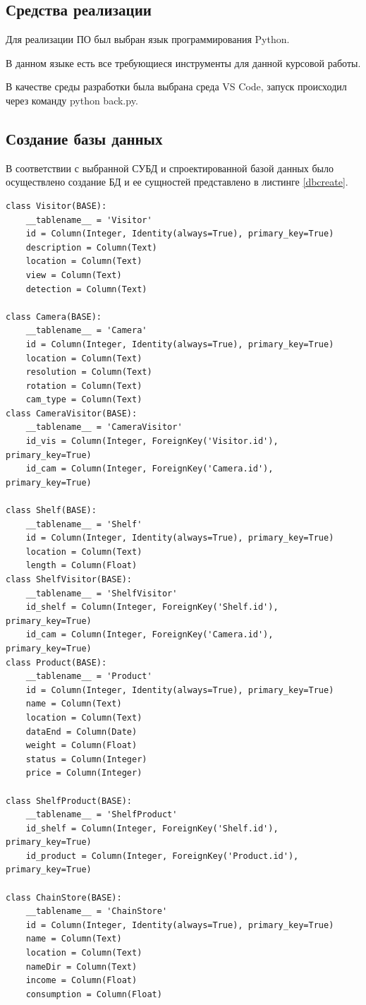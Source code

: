 \subsection{Средства реализации}

Для реализации ПО был выбран язык программирования Python\cite{python}.

В данном языке есть все требующиеся инструменты для данной курсовой работы.

В качестве среды разработки была выбрана среда VS Code\cite{vscode}, запуск
происходил через команду python back.py.

\subsection{Создание базы данных}

В соответствии с выбранной СУБД и спроектированной базой данных было
осуществлено создание БД и ее сущностей представлено в листинге \ref{dbcreate}.

\begin{lstlisting}[label=dbcreate, caption=Создание БД]
class Visitor(BASE):
    __tablename__ = 'Visitor'
    id = Column(Integer, Identity(always=True), primary_key=True)
    description = Column(Text)
    location = Column(Text)
    view = Column(Text)
    detection = Column(Text)

class Camera(BASE):
    __tablename__ = 'Camera'
    id = Column(Integer, Identity(always=True), primary_key=True)
    location = Column(Text)
    resolution = Column(Text)
    rotation = Column(Text)
    cam_type = Column(Text)
class CameraVisitor(BASE):
    __tablename__ = 'CameraVisitor'
    id_vis = Column(Integer, ForeignKey('Visitor.id'), primary_key=True)
    id_cam = Column(Integer, ForeignKey('Camera.id'), primary_key=True)

class Shelf(BASE):
    __tablename__ = 'Shelf'
    id = Column(Integer, Identity(always=True), primary_key=True)
    location = Column(Text)
    length = Column(Float)
class ShelfVisitor(BASE):
    __tablename__ = 'ShelfVisitor'
    id_shelf = Column(Integer, ForeignKey('Shelf.id'), primary_key=True)
    id_cam = Column(Integer, ForeignKey('Camera.id'), primary_key=True)
class Product(BASE):
    __tablename__ = 'Product'
    id = Column(Integer, Identity(always=True), primary_key=True)
    name = Column(Text)
    location = Column(Text)
    dataEnd = Column(Date)
    weight = Column(Float)
    status = Column(Integer)
    price = Column(Integer)

class ShelfProduct(BASE):
    __tablename__ = 'ShelfProduct'
    id_shelf = Column(Integer, ForeignKey('Shelf.id'), primary_key=True)
    id_product = Column(Integer, ForeignKey('Product.id'), primary_key=True)

class ChainStore(BASE):
    __tablename__ = 'ChainStore'
    id = Column(Integer, Identity(always=True), primary_key=True)
    name = Column(Text)
    location = Column(Text)
    nameDir = Column(Text)
    income = Column(Float)
    consumption = Column(Float)
\end{lstlisting}


